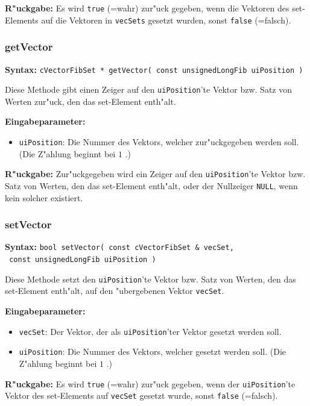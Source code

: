 \bigskip\noindent
\textbf{R"uckgabe:} Es wird \verb|true| (=wahr) zur"uck gegeben, wenn die Vektoren des set-Elements auf die Vektoren in \verb|vecSets| gesetzt wurden, sonst \verb|false| (=falsch).


\subsubsection{getVector}

\textbf{Syntax:} \verb|cVectorFibSet * getVector( const unsignedLongFib uiPosition )|

\bigskip\noindent
Diese Methode gibt einen Zeiger auf den \verb|uiPosition|'te Vektor bzw. Satz von Werten zur"uck, den das set-Element enth"alt.

\bigskip\noindent
\textbf{Eingabeparameter:}
\begin{itemize}
 \item \verb|uiPosition|: Die Nummer des Vektors, welcher zur"uckgegeben werden soll. (Die Z"ahlung beginnt bei $1$ .)
\end{itemize}

\bigskip\noindent
\textbf{R"uckgabe:} Zur"uckgegeben wird ein Zeiger auf den \verb|uiPosition|'te Vektor bzw. Satz von Werten, den das set-Element enth"alt, oder der Nullzeiger \verb|NULL|, wenn kein solcher existiert.


\subsubsection{setVector}

\textbf{Syntax:} \verb|bool setVector( const cVectorFibSet & vecSet,| \\\verb| const unsignedLongFib uiPosition )|

\bigskip\noindent
Diese Methode setzt den \verb|uiPosition|'te Vektor bzw. Satz von Werten, den das set-Element enth"alt, auf den "ubergebenen Vektor \verb|vecSet|.

\bigskip\noindent
\textbf{Eingabeparameter:}
\begin{itemize}
 \item \verb|vecSet|: Der Vektor, der als \verb|uiPosition|'ter Vektor gesetzt werden soll.
 \item \verb|uiPosition|: Die Nummer des Vektors, welcher gesetzt werden soll. (Die Z"ahlung beginnt bei $1$ .)
\end{itemize}

\bigskip\noindent
\textbf{R"uckgabe:} Es wird \verb|true| (=wahr) zur"uck gegeben, wenn der \verb|uiPosition|'te Vektor des set-Elements auf \verb|vecSet| gesetzt wurde, sonst \verb|false| (=falsch).



